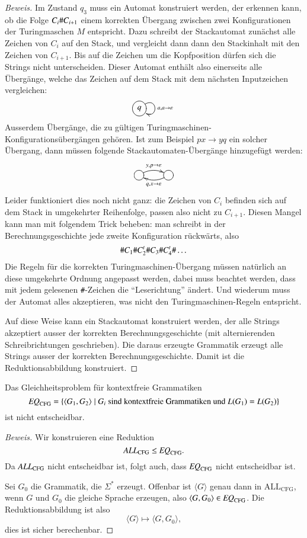 \begin{proof}[Beweis]
Im Zustand $q_3$ muss ein Automat konstruiert werden, der erkennen kann,
ob die Folge $C_i{\tt\#}C_{i+1}$ einem korrekten Übergang zwischen
zwei Konfigurationen der Turingmaschen $M$ entspricht.
Dazu schreibt
der Stackautomat zunächst alle Zeichen von $C_i$ auf den
Stack, und vergleicht dann dann den Stackinhalt mit den Zeichen von
$C_{i+1}$.
Bis auf die Zeichen um die Kopfposition dürfen sich
die Strings nicht unterscheiden.
Dieser Automat enthält also
einerseits alle Übergänge, welche das Zeichen auf dem Stack
mit dem nächsten Inputzeichen vergleichen:
\[
\entrymodifiers={++[o][F]}
\xymatrix{
q\ar@(ur,dr)^{a,a\to\varepsilon}
}
\]
Ausserdem Übergänge, die zu gültigen
Turingmaschinen-Konfigurationsübergängen gehören.
Ist zum Beispiel
$px\to yq$ ein solcher Übergang, dann müssen folgende
Stackautomaten-Übergänge hinzugefügt werden:
\[
\entrymodifiers={++[o][F]}
\xymatrix{
{}\ar@/^/[r]^{y,p\to\varepsilon}
	&\ar@/^/[l]^{q,x\to\varepsilon}
}
\]
Leider funktioniert dies noch nicht ganz: die Zeichen von $C_i$
befinden sich auf dem Stack in umgekehrter Reihenfolge, passen
also nicht zu $C_{i+1}$.
Diesen Mangel kann man mit folgendem
Trick beheben: man schreibt in der Berechnungsgeschichte jede
zweite Konfiguration rückwärts, also
\[
{\tt\#}C_1{\tt\#}C_2^t{\tt\#}C_3{\tt\#}C_4^t{\tt\#}\dots
\]
Die Regeln für die korrekten Turingmaschinen-Übergang müssen
natürlich an diese umgekehrte Ordnung angepasst werden, dabei
muss beachtet werden, dass mit jedem gelesenen {\tt\#}-Zeichen
die ``Leserichtung'' ändert.
Und wiederum muss der Automat alles
akzeptieren, was nicht den Turingmaschinen-Regeln entspricht.

Auf diese Weise kann ein Stackautomat konstruiert werden, der
alle Strings akzeptiert ausser der korrekten Berechnungsgeschichte
(mit alternierenden Schreibrichtungen geschrieben).
Die daraus
erzeugte Grammatik erzeugt alle Strings ausser der
korrekten Berechnungsgeschichte.
Damit ist die Reduktionsabbildung
konstruiert.
\end{proof}

\begin{satz}
%
Das Gleichheitsproblem für kontextfreie Grammatiken
\[
\text{\it EQ}_{\text{CFG}}=\{
\langle G_1,G_2\rangle\;|\;\text{$G_i$ sind kontextfreie Grammatiken
und $L(G_1)=L(G_2)$}
\}
\]
%
ist nicht entscheidbar.
\end{satz}

\begin{proof}[Beweis]
Wir konstruieren eine Reduktion
\[
\text{\it ALL}_{\text{CFG}}
\le
\text{\it EQ}_{\text{CFG}}.
\]
Da $\text{\it ALL}_{\text{CFG}}$ nicht entscheidbar ist, folgt
auch, dass $\text{\it EQ}_{\text{CFG}}$ nicht entscheidbar
ist.

Sei $G_0$ die Grammatik, die $\Sigma^*$ erzeugt.
Offenbar ist
$\langle G\rangle$ genau dann in $\text{ALL}_{\text{CFG}}$,
wenn $G$ und $G_0$ die gleiche Sprache erzeugen, also
$\langle G,G_0\rangle\in\text{\it EQ}_{\text{CFG}}$.
Die Reduktionsabbildung ist also
\[
\langle G\rangle \mapsto \langle G,G_0\rangle,
\]
dies ist sicher berechenbar.
\end{proof}


